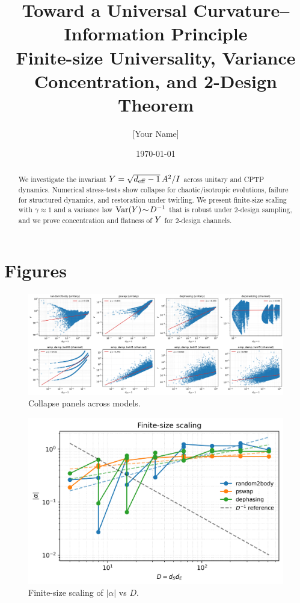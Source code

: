 \documentclass[11pt]{article}
\title{Toward a Universal Curvature--Information Principle\\
\large Finite-size Universality, Variance Concentration, and 2-Design Theorem}
\author{[Your Name]}
\date{\today}
\begin{document}
\maketitle

\begin{abstract}
We investigate the invariant $Y=\sqrt{d_{\mathrm{eff}}-1}\,A^2/I$ across unitary and CPTP dynamics.
Numerical stress-tests show collapse for chaotic/isotropic evolutions, failure for structured dynamics, and restoration under twirling.
We present finite-size scaling with $\gamma\!\approx\!1$ and a variance law $\mathrm{Var}(Y)\!\sim\!D^{-1}$ that is robust under 2-design sampling,
and we prove concentration and flatness of $Y$ for 2-design channels.
\end{abstract}



\section{Figures}
\begin{figure}[h]
\centering
\includegraphics[width=0.95\linewidth]{../figures/phase2_collapse_panels.png}
\caption{Collapse panels across models.}
\end{figure}

\begin{figure}[h]
\centering
\includegraphics[width=0.7\linewidth]{../figures/phase2_finite_size_scaling.png}
\caption{Finite-size scaling of $|\alpha|$ vs $D$.}
\end{figure}
\end{document}
